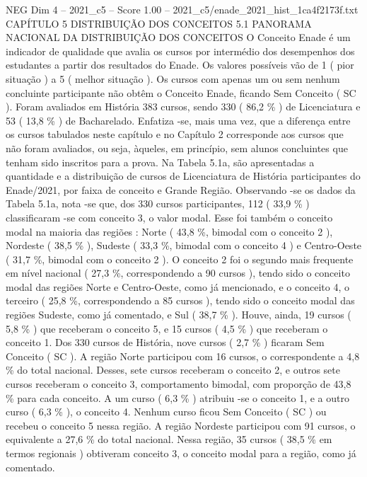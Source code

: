 \begin{textsample}{NEG Dim 4 – 2021\_c5 – Score 1.00 – 2021\_c5/enade\_2021\_hist\_1ca4f2173f.txt}  \label{ex:f4_neg_140}
CAPÍTULO 5 DISTRIBUIÇÃO DOS CONCEITOS 5.1 PANORAMA NACIONAL DA DISTRIBUIÇÃO DOS CONCEITOS O Conceito Enade é um indicador de qualidade que avalia os cursos por intermédio dos desempenhos dos estudantes a partir dos resultados do Enade.
Os valores possíveis vão de 1 ( pior situação ) a 5 ( melhor situação ).
Os cursos com apenas um ou sem nenhum concluinte participante não obtêm o Conceito Enade, ficando Sem Conceito ( SC ).
Foram avaliados em História 383 cursos, sendo 330 ( 86,2 \% ) de Licenciatura e 53 ( 13,8 \% ) de Bacharelado.
Enfatiza -se, mais uma vez, que a diferença entre os cursos tabulados neste capítulo e no Capítulo 2 corresponde aos cursos que não foram avaliados, ou seja, àqueles, em princípio, sem alunos concluintes que tenham sido inscritos para a prova.
Na Tabela 5.1a, são apresentadas a quantidade e a distribuição de cursos de Licenciatura de História participantes do Enade/2021, por faixa de conceito e Grande Região.
Observando -se os dados da Tabela 5.1a, nota -se que, dos 330 cursos participantes, 112 ( 33,9 \% ) classificaram -se com conceito 3, o valor modal.
Esse foi também o conceito modal na maioria das regiões : Norte ( 43,8 \%, bimodal com o conceito 2 ), Nordeste ( 38,5 \% ), Sudeste ( 33,3 \%, bimodal com o conceito 4 ) e Centro-Oeste ( 31,7 \%, bimodal com o conceito 2 ).
O conceito 2 foi o segundo mais frequente em nível nacional ( 27,3 \%, correspondendo a 90 cursos ), tendo sido o conceito modal das regiões Norte e Centro-Oeste, como já mencionado, e o conceito 4, o terceiro ( 25,8 \%, correspondendo a 85 cursos ), tendo sido o conceito modal das regiões Sudeste, como já comentado, e Sul ( 38,7 \% ).
Houve, ainda, 19 cursos ( 5,8 \% ) que receberam o conceito 5, e 15 cursos ( 4,5 \% ) que receberam o conceito 1.
Dos 330 cursos de História, nove cursos ( 2,7 \% ) ficaram Sem Conceito ( SC ).
A região Norte participou com 16 cursos, o correspondente a 4,8 \% do total nacional.
Desses, sete cursos receberam o conceito 2, e outros sete cursos receberam o conceito 3, comportamento bimodal, com proporção de 43,8 \% para cada conceito.
A um curso ( 6,3 \% ) atribuiu -se o conceito 1, e a outro curso ( 6,3 \% ), o conceito 4.
Nenhum curso ficou Sem Conceito ( SC ) ou recebeu o conceito 5 nessa região.
A região Nordeste participou com 91 cursos, o equivalente a 27,6 \% do total nacional.
Nessa região, 35 cursos ( 38,5 \% em termos regionais ) obtiveram conceito 3, o conceito modal para a região, como já comentado.

\end{textsample}
